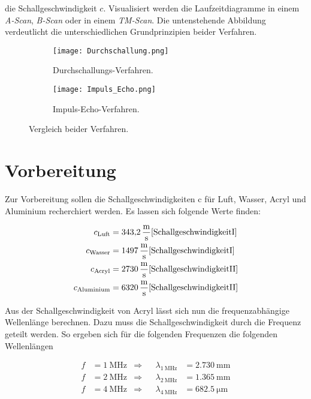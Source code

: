 \noindent die Schallgeschwindigkeit $c$. Visualisiert werden die Laufzeitdiagramme in einem \emph{A-Scan}, \emph{B-Scan} oder in 
einem \emph{TM-Scan}. Die untenstehende Abbildung verdeutlicht die unterschiedlichen Grundprinzipien beider Verfahren.

\begin{figure}
    \begin{subfigure}{0.48\textwidth}
        \centering
        \texttt{[image: Durchschallung.png]}
        \caption{Durchschallungs-Verfahren.}
        \label{fig:DSV}
    \end{subfigure}
    \hfill
    \begin{subfigure}{0.48\textwidth}
        \centering 
        \texttt{[image: Impuls\_Echo.png]}
        \caption{Impuls-Echo-Verfahren.}
        \label{fig:IEV}
    \end{subfigure}
    \caption{Vergleich beider Verfahren.}
    \label{fig:Vergleich}
\end{figure}

\section{Vorbereitung}
Zur Vorbereitung sollen die Schallgeschwindigkeiten c für Luft, Wasser, Acryl und Aluminium recherchiert werden. Es 
lassen sich folgende Werte finden:

\begin{align}
    c_\text{Luft}   &= \qty{343,2}{\meter \per \second}    \text{\cite{SchallgeschwindigkeitI}}     \\
    c_\text{Wasser} &= \qty{1497}{\meter \per \second}     \text{\cite{SchallgeschwindigkeitI}}    \\
    c_\text{Acryl}  &= \qty{2730}{\meter \per \second}     \text{\cite{SchallgeschwindigkeitII}}    \\
    c_\text{Aluminium} &= \qty{6320}{\meter \per \second}  \text{\cite{SchallgeschwindigkeitII}}     \\
\end{align}

\noindent Aus der Schallgeschwindigkeit von Acryl lässt sich nun die frequenzabhängige Wellenlänge berechnen. 
Dazu muss die Schallgeschwindigkeit durch die Frequenz geteilt werden. So ergeben sich für die folgenden Frequenzen 
die folgenden Wellenlängen

\begin{align}
    f &= \qty{1}{\mega \hertz} & \Rightarrow& & \lambda_{\qty{1}{\mega \hertz}} &= \qty{2,730}{\milli \meter}   \\
    f &= \qty{2}{\mega \hertz} & \Rightarrow& & \lambda_{\qty{2}{\mega \hertz}} &= \qty{1,365}{\milli \meter}   \\
    f &= \qty{4}{\mega \hertz} & \Rightarrow& & \lambda_{\qty{4}{\mega \hertz}} &= \qty{682,5}{\micro \meter}   \\
\end{align}



%
